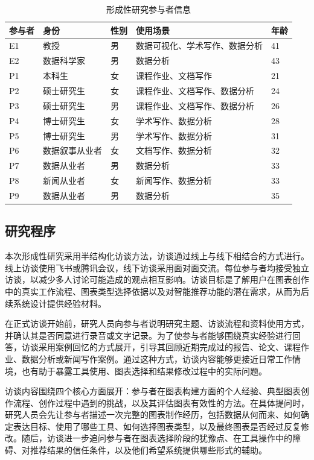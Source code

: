 \begin{table}[htbp]
\centering
\caption[形成性研究参与者信息]{形成性研究参与者信息}
\label{tab:formative_participant}
\small
\setlength{\tabcolsep}{3pt}
\begin{tabular}{lllll}
\toprule
参与者 & 身份 & 性别 & 使用场景 & 年龄 \\
\midrule
E1 & 教授 & 男 & 数据可视化、学术写作、数据分析 & 41 \\
E2 & 数据科学家 & 男 & 数据分析 & 43 \\
P1 & 本科生 & 女 & 课程作业、文档写作 & 21 \\
P2 & 硕士研究生 & 女 & 课程作业、文档写作、数据分析 & 24 \\
P3 & 硕士研究生 & 男 & 课程作业、文档写作、数据分析 & 26 \\
P4 & 博士研究生 & 女 & 学术写作、数据分析 & 28 \\
P5 & 博士研究生 & 男 & 学术写作、数据分析 & 31 \\
P6 & 数据叙事从业者 & 女 & 文档写作、数据分析 & 32 \\
P7 & 数据从业者 & 男 & 数据分析 & 33 \\
P8 & 新闻从业者 & 女 & 新闻写作、数据分析 & 33 \\
P9 & 数据从业者 & 男 & 数据分析 & 35 \\
\bottomrule
\end{tabular}
\end{table}

\subsection{研究程序}

本次形成性研究采用半结构化访谈方法，访谈通过线上与线下相结合的方式进行。线上访谈使用飞书或腾讯会议，线下访谈采用面对面交流。每位参与者均接受独立访谈，以减少多人讨论可能造成的观点相互影响。访谈目标是了解用户在图表创作中的真实工作流程、图表类型选择依据以及对智能推荐功能的潜在需求，从而为后续系统设计提供经验材料。

在正式访谈开始前，研究人员向参与者说明研究主题、访谈流程和资料使用方式，并确认其是否同意进行录音或文字记录。为了使参与者能够围绕真实经验进行回答，访谈采用案例回忆的方式展开，引导其回顾近期完成过的报告、论文、课程作业、数据分析或新闻写作案例。通过这种方式，访谈内容能够更接近日常工作情境，也有助于暴露工具使用、图表选择和结果修改过程中的实际问题。

访谈内容围绕四个核心方面展开：参与者在图表构建方面的个人经验、典型图表创作流程、创作过程中遇到的挑战，以及其评估图表有效性的方法。在具体提问时，研究人员会先让参与者描述一次完整的图表制作经历，包括数据从何而来、如何确定表达目标、使用了哪些工具、如何选择图表类型，以及最终图表是否经过反复修改。随后，访谈进一步追问参与者在图表选择阶段的犹豫点、在工具操作中的障碍、对推荐结果的信任条件，以及他们希望系统提供哪些形式的辅助。

